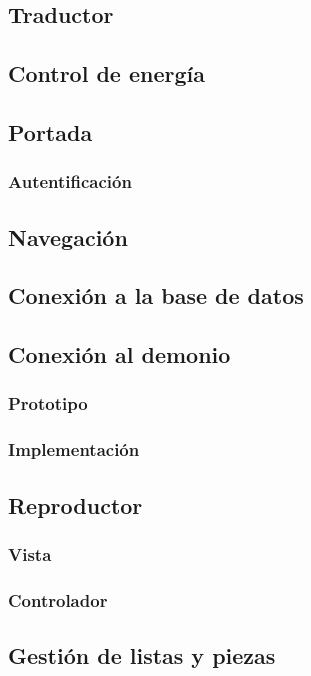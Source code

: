 \subsection{Traductor}

\subsection{Control de energía}

\subsection{Portada}
\subsubsection{Autentificación}

\subsection{Navegación}

\subsection{Conexión a la base de datos}

\subsection{Conexión al demonio}
\subsubsection{Prototipo}
\subsubsection{Implementación}

\subsection{Reproductor}
\subsubsection{Vista}
\subsubsection{Controlador}

\subsection{Gestión de listas y piezas}

